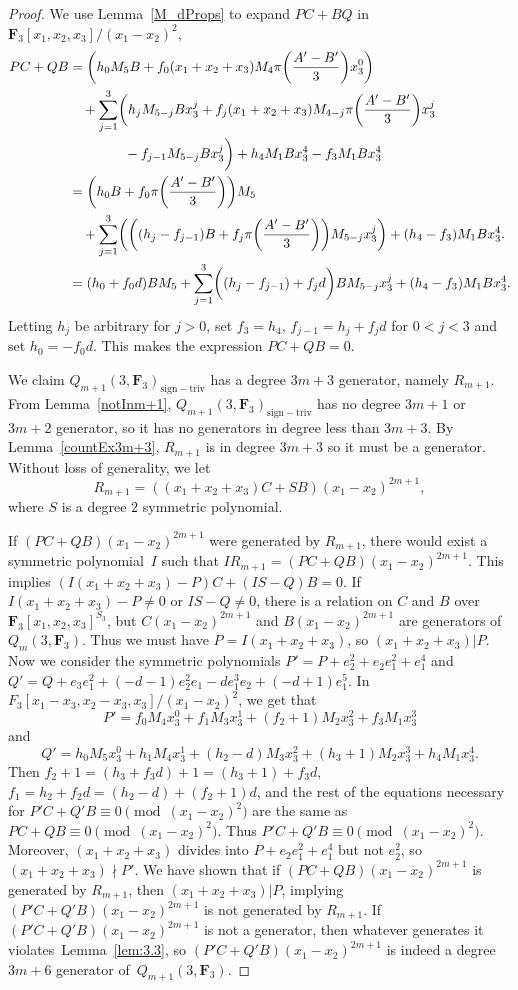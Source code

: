 \documentclass[11pt]{article}
\numberwithin{equation}{section}
\theoremstyle{definition}
\numberwithin{equation}{section}
\newcommand{\siv}{\mathrm{sign-triv}}
\begin{document}
\begin{proof}
 We use Lemma~\ref{M_dProps} to expand $PC+BQ$ in $\mathbf{F}_3[x_1,x_2,x_3]/(x_1-x_2)^2$,
 \begin{align*}
 PC+QB&=\biggl(h_0M_5B+f_0(x_1+x_2+x_3)M_4\pi\biggl(\frac{A'-B'}{3}\biggr)x_3^0\biggr) \\
 &\quad + \sum _{j=1}^{3}\biggl(h_{j}M_{5-j}Bx_3^j+f_{j}(x_1+x_2+x_3)M_{4-j}\pi\biggl(\frac{A'-B'}{3}\biggr)x_3^{j}\\
 &\quad\hphantom{+ \sum _{j=1}^{3}\biggl(}{}- f_{j-1}M_{5-j}Bx_3^j\bigg)+ h_4M_1Bx_3^4-f_3M_1Bx_3^4 \\
 &=\biggl(h_0B+f_0\pi\biggl(\frac{A'-B'}{3}\biggr)\biggr)M_5 \\
 &\quad + \sum _{j=1}^{3}\biggl(\biggl((h_{j} - f_{j-1})B+f_{j}\pi\biggl(\frac{A'-B'}{3}\biggr)\biggr)M_{5-j}x_3^j\biggr) + (h_4-f_3)M_1Bx_3^4. \\
 &=(h_0+f_0d)BM_5 + \sum _{j=1}^{3}\biggl((h_{j} - f_{j-1})+f_{j}d\biggr)BM_{5-j}x_3^j + (h_4-f_3)M_1Bx_3^4.
 \end{align*}
 Letting $h_j$ be arbitrary for $j>0$, set $f_3=h_4$, $f_{j-1} = h_{j}+f_jd$ for $0<j<3$ and set $h_0=-f_0d$. This makes the expression $PC+QB=0$.

 We claim $Q_{m+1}(3,\mathbf{F}_3)_{\siv}$ has a degree $3m+3$ generator, namely $R_{m+1}$. From Lemma~\ref{notInm+1}, $Q_{m+1}(3,\mathbf{F}_3)_{\siv}$ has no degree $3m+1$ or $3m+2$ generator, so it has no generators in degree less than $3m+3$. By Lemma~\ref{countEx3m+3}, $R_{m+1}$ is in degree $3m+3$ so it must be a generator. Without loss of generality, we let
 \[R_{m+1}=\left((x_1+x_2+x_3)C + SB\right)(x_1-x_2)^{2m+1},\]
 where $S$ is a degree $2$ symmetric polynomial.

 If $(PC+QB)(x_1-x_2)^{2m+1}$ were generated by $R_{m+1}$, there would exist a symmetric polynomial~$I$ such that $IR_{m+1}=(PC+QB)(x_1-x_2)^{2m+1}$. This implies $(I(x_1+x_2+x_3)-P)C+(IS-Q)B=0$. If $I(x_1+x_2+x_3)-P\neq 0$ or $IS-Q\neq 0$, there is a relation on $C$ and $B$ over $\mathbf{F}_3[x_1,x_2,x_3]^{S_3}$, but $C(x_1-x_2)^{2m+1}$ and $B(x_1-x_2)^{2m+1}$ are generators of $Q_m(3,\mathbf{F}_3)$. Thus we must have $P= I(x_1+x_2+x_3)$, so $(x_1+x_2+x_3)|P$. Now we consider the symmetric polynomials $P'=P+e_2^2+e_2e_1^2+e_1^4$ and $Q' = Q+e_3e_1^2+(-d-1)e_2^2e_1-de_1^3e_2+(-d+1)e_1^5$. In $F_3[x_1-x_3,x_2-x_3,x_3]/(x_1-x_2)^2$, we get that
 \[P'=f_0M_4x_3^0+f_1M_{3}x_3^1 + (f_{2}+1)M_2x_3^{2}+f_{3}M_1x_3^{3}\]
 and
 \[Q'=h_0M_5x_3^0+h_1M_4x_3^1+(h_2-d)M_3x_3^2+(h_3+1)M_2x_3^3+h_4M_1x_3^4.\]
 Then $f_2+1 = (h_3+f_3d)+1=(h_3+1)+f_3d$, $f_1=h_2+f_2d = (h_2-d)+(f_2+1)d$, and the rest of the equations necessary for $P'C+Q'B\equiv 0\pmod{(x_1-x_2)^2}$ are the same as $PC+QB\equiv 0\pmod{(x_1-x_2)^2}$. Thus $P'C+Q'B\equiv 0\pmod{(x_1-x_2)^2}$. Moreover, $(x_1+x_2+x_3)$ divides into $P+e_2e_1^2+e_1^4$ but not $e_2^2$, so $(x_1+x_2+x_3)\nmid P'$. We have shown that if ${(PC+QB)(x_1-x_2)^{2m+1}}$ is generated by $R_{m+1}$, then $(x_1+x_2+x_3)|P$, implying ${(P'C+Q'B)(x_1-x_2)^{2m+1}}$ is not generated by $R_{m+1}$. If $(P'C+Q'B)(x_1-x_2)^{2m+1}$ is not a generator, then whatever generates it violates~Lemma~\ref{lem:3.3}, so $(P'C+Q'B)(x_1-x_2)^{2m+1}$ is indeed a degree $3m+6$ generator of~$Q_{m+1}(3,\mathbf{F}_3)$.
 \end{proof}
\end{document}
